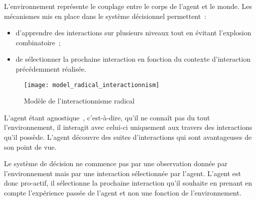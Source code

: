 \documentclass{llncs}
\begin{document}
L'environnement représente le couplage entre le corps de l'agent et le monde. %
Les mécanismes mis en place dans le système décisionnel permettent~:
\begin{itemize}
	\item d'apprendre des interactions sur plusieurs niveaux 
	 tout en évitant l'explosion combinatoire~;
	\item de sélectionner la prochaine interaction en fonction du contexte d'interaction précédemment réalisée. 
\end{itemize}

\begin{figure}
	\centering
	\texttt{[image: model\_radical\_interactionnism]}
	\caption{Modèle de l'interactionnisme radical}
	\label{fig:model_radical_interactionnism}
\end{figure}
L'agent étant agnostique~\cite{Liris-5510-environment-agnostic}, c'est-à-dire, qu'il ne connaît pas du tout l'environnement, il interagit avec celui-ci uniquement aux travers des interactions qu'il possède. L'agent découvre des suites d'interactions qui sont avantageuses de son point de vue. 


Le système de décision ne commence pas par une observation donnée par l'environnement 
mais par une interaction sélectionnée par l'agent. 
L'agent est donc pro-actif, il sélectionne la prochaine interaction qu'il souhaite \enact en prenant en compte l'expérience passée de l'agent et non une fonction de l'environnement.
\end{document}
